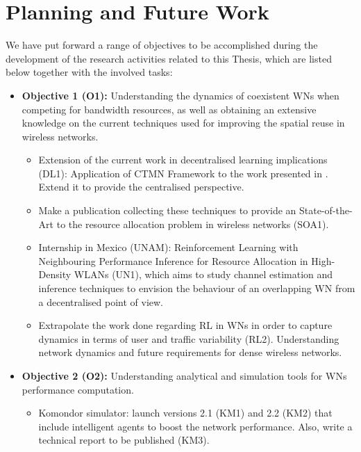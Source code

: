 \documentclass[12pt, a4paper,twoside]{tesi_upf}
\begin{document}
	\chapter{Planning and Future Work}
	\label{section:future_work}
		
		We have put forward a range of objectives to be accomplished during the development of the research activities related to this Thesis, which are listed below together with the involved tasks:
		\begin{itemize}
			\item \textbf{Objective 1 (O1):} Understanding the dynamics of coexistent WNs when competing for bandwidth resources, as well as obtaining an extensive knowledge on the current techniques used for improving the spatial reuse in wireless networks.
			\begin{itemize}
				\item Extension of the current work in decentralised learning implications (DL1): Application of CTMN Framework to the work presented in \cite{wilhelmi2017implications}. Extend it to provide the centralised perspective.
				\item Make a publication collecting these techniques to provide an State-of-the-Art to the resource allocation problem in wireless networks (SOA1).
				\item Internship in Mexico (UNAM): Reinforcement Learning with Neighbouring Performance Inference for Resource Allocation in High-Density WLANs (UN1), which aims to study channel estimation and inference techniques to envision the behaviour of an overlapping WN from a decentralised point of view.
				\item Extrapolate the work done regarding RL in WNs in order to capture dynamics in terms of user and traffic variability (RL2). Understanding network dynamics and future requirements for dense wireless networks.
			\end{itemize}
			\item \textbf{Objective 2 (O2):} Understanding analytical and simulation tools for WNs performance computation.
			\begin{itemize}
				\item Komondor simulator: launch versions 2.1 (KM1) and 2.2 (KM2) that include intelligent agents to boost the network performance. Also, write a technical report to be published (KM3).

\end{itemize}
\end{itemize}
\end{document}
